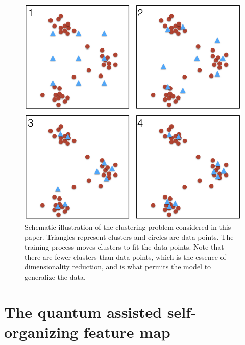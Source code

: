 \documentclass[pra,showkeys,twocolumn,showpacs,aps,10pt]{revtex4-2}
\begin{document}
\begin{figure}
    \includegraphics[width=0.95\columnwidth]{sofm_fitting.png}
  \caption{
    Schematic illustration of the clustering problem considered in this paper.
    Triangles represent clusters and circles are data points.
    The training process moves clusters to fit the data points.
    Note that there are fewer clusters than data points,
    which is the essence of dimensionality reduction,
    and is what permits the model to generalize the data.
  }
  \label{fig:sofm_fitting}
\end{figure}


























\section{The quantum assisted self-organizing feature map}
\label{sec:qasofm}
\end{document}
